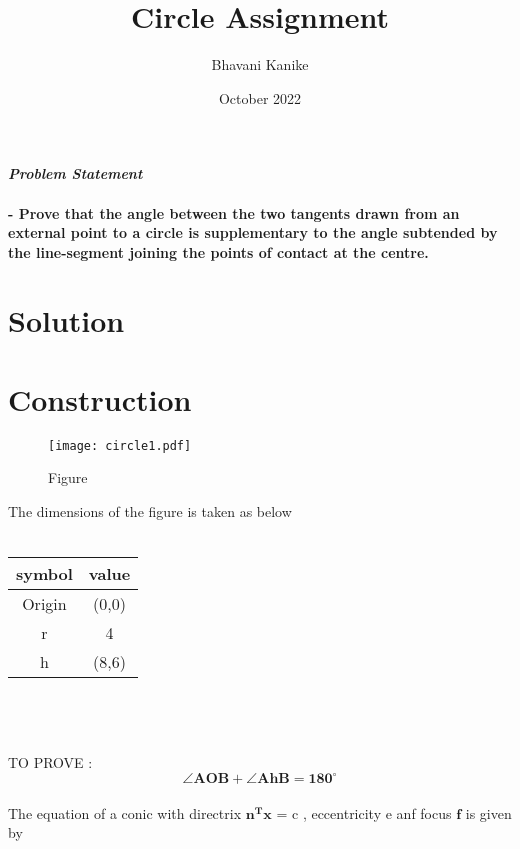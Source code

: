 \documentclass[journal,10pt,twocolumn]{article}
\title{\textbf{Circle Assignment}}
\author{Bhavani Kanike}
\date{October 2022}
\let\vec\mathbf
\begin{document}
\maketitle
\paragraph{\textit{Problem Statement} \\\\- Prove that the angle between the two tangents drawn from an external point to a circle is supplementary to the angle subtended by the line-segment joining the points of contact at the centre.}

\section*{\large Solution}

\section*{\large Construction}

\begin{figure}[h]
\centering
\texttt{[image: circle1.pdf]}
\caption{Figure}
\label{fig:triangle}
\end{figure}

The dimensions of the figure is taken as below\\\\
{
\setlength\extrarowheight{2pt}
\centering
	\begin{tabular}{|c|c|}
	\hline
	\textbf{symbol}&\textbf{value}\\
	\hline
	Origin&(0,0)\\
	\hline
	r&4\\
	\hline
	h&(8,6)\\
	\hline
\end{tabular}
}
\\\\\\

TO PROVE :
\begin{equation}
	 \boldsymbol{\angle{AOB} + \angle{AhB} = 180^\circ}
\end{equation}\\
	The equation of a conic with directrix $\vec{n^Tx}$ = c , eccentricity e anf focus $\boldsymbol{f}$ is given by
	
\end{document}
